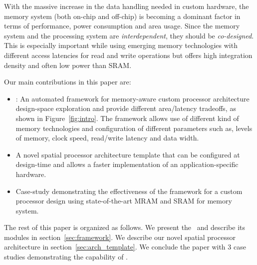 With the massive increase in the data handling needed in custom hardware, the memory system (both on-chip and off-chip) is becoming a dominant factor in terms of performance, power consumption and area usage. Since the memory system and the processing system are \textit{interdependent}, they should be \textit{co-designed}. This is especially important while using emerging memory technologies with different access latencies for read and write operations but offers high integration density and often low power than SRAM.

Our main contributions in this paper are:
\begin{itemize}
\item \frameworkname: An automated framework for memory-aware custom processor architecture design-space exploration and provide different area/latency tradeoffs, as shown in Figure~\ref{fig:intro}. The framework allows use of different kind of memory technologies and configuration of different parameters such as, levels of memory, clock speed, read/write latency and data width. 
\item A novel spatial processor architecture template that can be configured at design-time and allows a faster implementation of an application-specific hardware.
\item Case-study demonstrating the effectiveness of the framework for a custom processor design using state-of-the-art MRAM and SRAM for memory system.




\end{itemize}


The rest of this paper is organized as follows. We present the \frameworkname~and describe its modules in section~\ref{sec:framework}. We describe our novel spatial processor architecture in section~\ref{sec:arch_template}. We conclude the paper with 3 case studies demonstrating the capability of \frameworkname.

